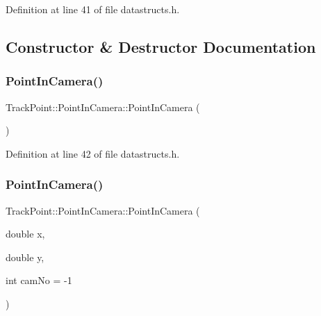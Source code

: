 Definition at line 41 of file datastructs.\+h.



\subsection{Constructor \& Destructor Documentation}
\mbox{\label{struct_track_point_1_1_point_in_camera_ae0b3c98aea0a52506f1fab2c2ea3ae19}} 
\subsubsection{\texorpdfstring{PointInCamera()}{PointInCamera()}\hspace{0.1cm}{\footnotesize\ttfamily [1/2]}}
{\footnotesize\ttfamily Track\+Point\+::\+Point\+In\+Camera\+::\+Point\+In\+Camera (\begin{DoxyParamCaption}{ }\end{DoxyParamCaption})\hspace{0.3cm}{\ttfamily [inline]}}



Definition at line 42 of file datastructs.\+h.

\mbox{\label{struct_track_point_1_1_point_in_camera_ac9468bb4df9c6dc5687e5c342d447b19}} 
\subsubsection{\texorpdfstring{PointInCamera()}{PointInCamera()}\hspace{0.1cm}{\footnotesize\ttfamily [2/2]}}
{\footnotesize\ttfamily Track\+Point\+::\+Point\+In\+Camera\+::\+Point\+In\+Camera (\begin{DoxyParamCaption}\item[{double}]{x,  }\item[{double}]{y,  }\item[{int}]{cam\+No = {\ttfamily -\/1} }\end{DoxyParamCaption})\hspace{0.3cm}{\ttfamily [inline]}}



